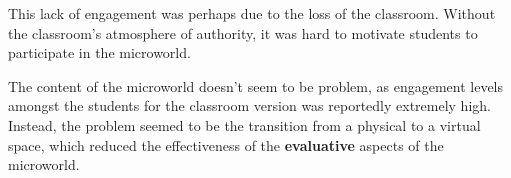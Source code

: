 This lack of engagement was perhaps due to the loss of the classroom.
Without the classroom's atmosphere of authority, it was hard to motivate
students to participate in the microworld.

The content of the microworld doesn't seem to be problem, as engagement
levels amongst the students for the classroom version was reportedly
extremely high\cite{ingulfson}. Instead, the problem seemed to be the
transition from a physical to a virtual space, which reduced the effectiveness of the
\textbf{evaluative} aspects of the microworld.
